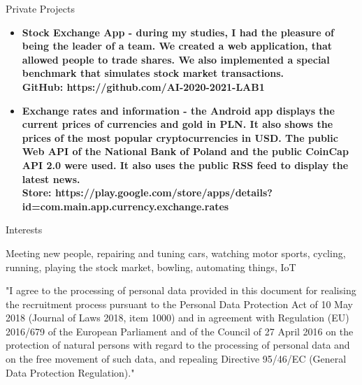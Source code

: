 \documentclass{resume}
\begin{document}
\begin{rSection}{Private Projects}

    \begin{itemize}
        \item \bf Stock Exchange App \normalfont - during my studies, I had the pleasure of being the leader of a team.
              We created a web application, that allowed people to trade shares. We also implemented a special benchmark that simulates stock market transactions.\\
              GitHub: https://github.com/AI-2020-2021-LAB1
        \item \bf Exchange rates and information \normalfont - the Android app displays the current prices of currencies and gold in PLN.
              It also shows the prices of the most popular cryptocurrencies in USD.
              The public Web API of the National Bank of Poland and the public CoinCap API 2.0 were used.
              It also uses the public RSS feed to display the latest news.\\
              Store: https://play.google.com/store/apps/details?id=com.main.app.currency.exchange.rates
    \end{itemize}

\end{rSection}

\begin{rSection}{Interests}

    {Meeting new people, repairing and tuning cars, watching motor sports, cycling, running, playing the stock market, bowling, automating things, IoT}

\end{rSection}

{\footnotesize "I agree to the processing of personal data provided in this document for realising the recruitment process pursuant to the Personal Data
Protection Act of 10 May 2018 (Journal of Laws 2018, item 1000) and in agreement with Regulation (EU) 2016/679 of the European Parliament and of
the Council of 27 April 2016 on the protection of natural persons with regard to the processing of personal data and on the free movement of such
data, and repealing Directive 95/46/EC (General Data Protection Regulation)."}
\end{document}
